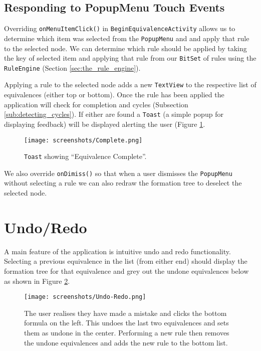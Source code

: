 \documentclass{report}
\begin{document}
\subsection{Responding to PopupMenu Touch Events}
\label{sub:responding_to_popupmenu_touch_events}

Overriding {\tt onMenuItemClick()} in {\tt BeginEquivalenceActivity} allows us to determine which item was selected from the {\tt PopupMenu} and and apply that rule to the selected node. We can determine which rule should be applied by taking the key of selected item and applying that rule from our {\tt BitSet} of rules using the {\tt RuleEngine} (Section \ref{sec:the_rule_engine}).

Applying a rule to the selected node adds a new {\tt TextView} to the respective list of equivalences (either top or bottom). Once the rule has been applied the application will check for completion and cycles (Subsection \ref{sub:detecting_cycles}). If either are found a {\tt Toast} (a simple popup for displaying feedback) will be displayed alerting the user (Figure \ref{complete}.

\begin{figure}[ht!]
    \centering
    \texttt{[image: screenshots/Complete.png]}
    \caption{{\tt Toast} showing ``Equivalence Complete''.}
    \label{complete}
\end{figure}

We also override {\tt onDimiss()} so that when a user dismisses the {\tt PopupMenu} without selecting a rule we can also redraw the formation tree to deselect the selected node.

\section{Undo/Redo}
\label{sec:undo_redo}

A main feature of the application is intuitive undo and redo functionality. Selecting a previous equivalence in the list (from either end) should display the formation tree for that equivalence and grey out the undone equivalences below as shown in Figure \ref{undoredo}.

\begin{figure}[ht]
    \centering
    \texttt{[image: screenshots/Undo-Redo.png]}
    \caption{The user realises they have made a mistake and clicks the bottom formula on the left. This undoes the last two equivalences and sets them as undone in the center. Performing a new rule then removes the undone equivalences and adds the new rule to the bottom list.}
    \label{undoredo}
\end{figure}
\end{document}
